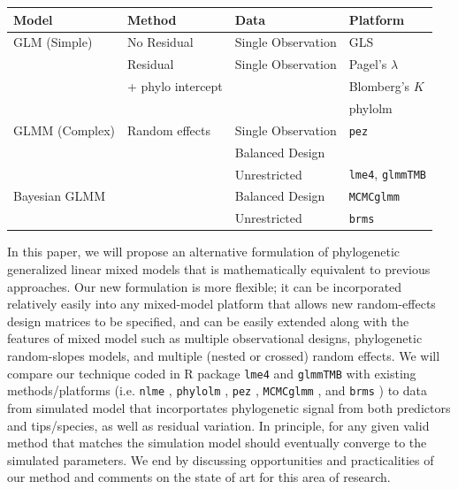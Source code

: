\newcommand{\pkg}[1]{{\tt #1}}
\newcommand{\code}[1]{{\tt #1}}

\begin{tabularx}{\textwidth}{|X|X|X|X|}
\hline
Model & Method & Data & Platform \\
\hline
\hline
GLM (Simple)  & No Residual & Single Observation & GLS \\
\hline
              & Residual    & Single Observation & Pagel's $\lambda$ \\
              & + phylo intercept &                    & Blomberg's $K$ \\ 
              &             &                    & phylolm \\
\hline
GLMM (Complex)& Random effects & Single Observation & \pkg{pez} \\ 
              &                & Balanced Design &  \\
\hline
              &                & Unrestricted  & \pkg{lme4}, \pkg{glmmTMB} \\
\hline
Bayesian GLMM &                & Balanced Design & \pkg{MCMCglmm} \\ 
\hline        
              &                & Unrestricted   & \pkg{brms} \\
\hline
\end{tabularx}


In this paper, we will propose an alternative formulation of phylogenetic generalized linear mixed models that is mathematically equivalent to previous approaches.
Our new formulation is more flexible; it can be incorporated relatively easily into any mixed-model platform that allows new random-effects design matrices to be specified, and can be easily extended along with the features of mixed model such as multiple observational designs, phylogenetic random-slopes models, and multiple (nested or crossed) random effects.
We will compare our technique coded in R package \pkg{lme4} and \pkg{glmmTMB} with existing methods/platforms (i.e. \pkg{nlme} \citep{pinheiro2014r}, \pkg{phylolm} \citep{ho2014phylolm}, \pkg{pez} \citep{pearse2015pez}, \pkg{MCMCglmm} \cite{hadfield2010mcmc}, and \pkg{brms} \citep{burkner2016brms}) to data from simulated model that incorportates phylogenetic signal from both predictors and tips/species, as well as residual variation.
In principle, for any given valid method that matches the simulation model should eventually converge to the simulated parameters. 
We end by discussing opportunities and practicalities of our method and comments on the state of art for this area of research. 

